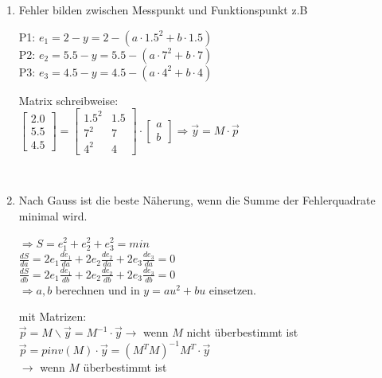 \begin{enumerate}[start=2]
\begin{enumerate}
\begin{enumerate}
								\item Fehler bilden zwischen Messpunkt und Funktionspunkt z.B\\
											\begin{minipage}{10cm}
												P1:  $e_1=2-y=2-(a\cdot 1.5^2+b\cdot 1.5)$\\
												P2:  $e_2=5.5-y=5.5-(a\cdot 7^2+b\cdot 7)$\\
												P3:  $e_3=4.5-y=4.5-(a\cdot 4^2+b\cdot 4)$\\
											\end{minipage}
											\begin{minipage}{6cm}
												Matrix schreibweise:\\
												$\left[\begin{matrix}
													2.0\\
													5.5\\
													4.5
												\end{matrix}\right] =
												\left[\begin{matrix}
													1.5^2 & 1.5 \\
													7^2 & 7\\
													4^2 & 4
												\end{matrix}\right] \cdot
												\left[\begin{matrix}
													a \\
													b
												\end{matrix}\right] \Rightarrow
												\vec{y} = M \cdot \vec{p}$
											\end{minipage}\\
											
											
								\item	Nach Gauss ist die beste Näherung, wenn die Summe der
											Fehlerquadrate minimal wird.\\
											\begin{minipage}{8cm}
												$\Rightarrow S = e_1^2+e_2^2+e_3^2=min$\\
												$\frac{d S}{d a}=
												2 e_1 \frac{d e_1}{d a}+
												2 e_2 \frac{d e_2}{d a}+
												2 e_3 \frac{d e_3}{d a}=0$\\
												$\frac{d S}{d b}=
												2 e_1 \frac{d e_1}{d b}+
												2 e_2 \frac{d e_2}{d b}+
												2 e_3 \frac{d e_3}{d b}=0$\\
												$\Rightarrow a, b$ berechnen und in $y = au^2 + bu$ einsetzen.
											\end{minipage}
											\begin{minipage}{9cm}
												mit Matrizen:\\
												$\vec{p} = M\backslash\vec{y} = M^{-1} \cdot \vec{y} \rightarrow$ wenn $M$ nicht überbestimmt ist\\
												$\vec{p} = pinv(M)\cdot \vec{y} = (M^TM)^{-1}M^T \cdot \vec{y}$\\
												$\rightarrow$ wenn $M$ überbestimmt ist\\
											\end{minipage}
											

\end{enumerate}
\end{enumerate}
\end{enumerate}
